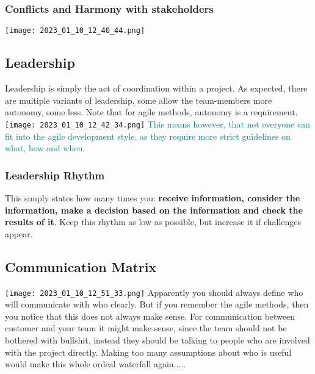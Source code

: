 \documentclass[main.tex,fontsize=12pt,paper=a4,paper=landscape,DIV=calc,]{scrartcl}
\begin{document}
\begin{multicols*}{2}
\subsubsection{Conflicts and Harmony with stakeholders}
\texttt{[image: 2023\_01\_10\_12\_40\_44.png]}

\subsection{Leadership}
Leadership is simply the act of coordination within a project.\newline
As expected, there are multiple variants of leadership, some allow the team-members more autonomy, some less.\newline
Note that for agile methods, autonomy is a requirement.\newline
\texttt{[image: 2023\_01\_10\_12\_42\_34.png]}\newline
\textcolor{teal}{This means however, that not everyone can fit into the agile development style, as they require more strict guidelines on what, how and when.} 

\subsubsection{Leadership Rhythm} 
This simply states how many times you: \textbf{receive information, consider the information, make a decision based on the information and check the results of it}.\newline
Keep this rhythm as low as possible, but increase it if challenges appear.

\subsection{Communication Matrix}
\texttt{[image: 2023\_01\_10\_12\_51\_33.png]}\newline
Apparently you should always define who will communicate with who clearly.\newline
But if you remember the agile methods, then you notice that this does not always make sense.\newline
For communication between customer and your team it might make sense, since the team should not be bothered with bullshit, instead they should be talking to people who are involved with the project directly.\newline
Making too many assumptions about who is useful would make this whole ordeal waterfall again.....
 

\end{multicols*}
\end{document}
